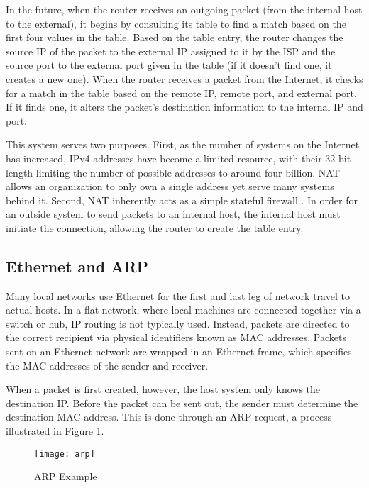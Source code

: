 \par In the future, when the router receives an outgoing packet (from the internal host to the external), it begins by consulting its table to find a match based on the first four values in the table. Based on the table entry, the router changes the source \ac{IP} of the packet to the external IP assigned to it by the \ac{ISP} and the source port to the external port given in the table (if it doesn't find one, it creates a new one). When the router receives a packet from the Internet, it checks for a match in the table based on the remote IP, remote port, and external port. If it finds one, it alters the packet's destination information to the internal IP and port.

\par This system serves two purposes. First, as the number of systems on the Internet has increased, \ac{IPv4} addresses have become a limited resource, with their 32-bit length limiting the number of possible addresses to around four billion. \ac{NAT} allows an organization to only own a single address yet serve many systems behind it. Second, \ac{NAT} inherently acts as a simple stateful firewall \cite{DynAddrMalProp}. In order for an outside system to send packets to an internal host, the internal host must initiate the connection, allowing the router to create the table entry.

\subsection{Ethernet and \acf{ARP}}
\label{sec:eth_routing}
\par Many local networks use Ethernet for the first and last leg of network travel to actual hosts. In a flat network, where local machines are connected together via a switch or hub, \ac{IP} routing is not typically used. Instead, packets are directed to the correct recipient via physical identifiers known as \ac{MAC} addresses. Packets sent on an Ethernet network are wrapped in an Ethernet frame, which specifies the \ac{MAC} addresses of the sender and receiver.

\par When a packet is first created, however, the host system only knows the destination \ac{IP}. Before the packet can be sent out, the sender must determine the destination \ac{MAC} address. This is done through an \ac{ARP} request, a process illustrated in Figure \ref{fig:arp_example}.

\begin{figure}[ht]
\caption{\ac{ARP} Example}
\label{fig:arp_example}
\centering
\texttt{[image: arp]}
\end{figure}

